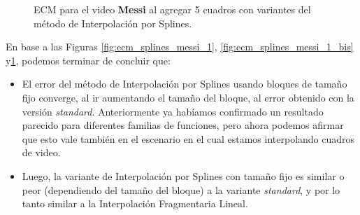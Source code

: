 \begin{figure}[H]
	\centering
	\caption{ECM para el video \textbf{Messi} al agregar 5 cuadros con variantes del método de Interpolación por Splines.}
	\label{fig:ecm_splines_messi_5}
\end{figure}

En base a las Figuras \ref{fig:ecm_splines_messi_1}, \ref{fig:ecm_splines_messi_1_bis} y\ref{fig:ecm_splines_messi_5}, podemos terminar de concluir que:

\begin{itemize}
    \item El error del método de Interpolación por Splines usando bloques de tamaño fijo converge, al
        ir aumentando el tamaño del bloque, al error obtenido con la versión \textit{standard}.
        Anteriormente ya habíamos confirmado un resultado parecido para diferentes familias de funciones,
        pero ahora podemos afirmar que esto vale también en el escenario en el cual estamos interpolando
        cuadros de video.
    \item Luego, la variante de Interpolación por Splines con tamaño fijo es
        similar o peor (dependiendo del tamaño del bloque) a la variante \textit{standard}, y por lo tanto
        similar a la Interpolación Fragmentaria Lineal.
\end{itemize}

